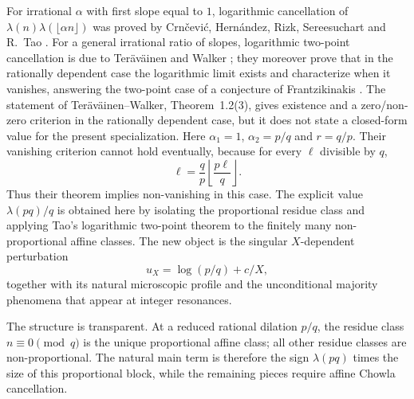 \documentclass[preprint,12pt]{elsarticle}
\numberwithin{equation}{section}
\theoremstyle{plain}
\theoremstyle{definition}
\theoremstyle{definition}
\theoremstyle{remark}
\begin{document}
For irrational $\alpha$ with first slope equal to $1$, logarithmic
cancellation of
$\lambda(n)\lambda(\lfloor\alpha n\rfloor)$ was proved by
Crn\v{c}evi\'c, Hern\'andez, Rizk, Sereesuchart and R.~Tao
\cite{CHRST2024}. For a general irrational ratio of slopes, logarithmic
two-point cancellation is due to Ter\"av\"ainen and Walker
\cite[Theorem~1.2]{TeravainenWalker2025}; they moreover prove that in the
rationally dependent case the logarithmic limit exists and characterize when
it vanishes, answering the two-point case of a conjecture of Frantzikinakis
\cite{Frantzikinakis2020}. The statement of Ter\"av\"ainen--Walker, Theorem~1.2(3), gives existence
and a zero/non-zero criterion in the rationally dependent case, but it does
not state a closed-form value for the present specialization. Here
$\alpha_1=1$, $\alpha_2=p/q$ and $r=q/p$. Their vanishing criterion cannot
hold eventually, because for every $\ell$ divisible by $q$,
\begin{equation}
\ell=\frac qp\left\lfloor\frac{p\ell}{q}\right\rfloor.
\label{eq:o3}
\end{equation}
Thus their theorem implies non-vanishing in this case. The explicit value
$\lambda(pq)/q$ is obtained here by isolating the proportional residue class
and applying Tao's logarithmic two-point theorem to the finitely many
non-proportional affine classes. The new object is the singular
$X$-dependent perturbation
\begin{equation}
u_X=\log(p/q)+c/X,
\label{eq:o4}
\end{equation}
together with its natural microscopic profile and the unconditional majority
phenomena that appear at integer resonances.

The structure is transparent. At a reduced rational dilation $p/q$, the
residue class $n\equiv0\pmod q$ is the unique proportional affine class; all
other residue classes are non-proportional. The natural main term is therefore
the sign $\lambda(pq)$ times the size of this proportional block, while the
remaining pieces require affine Chowla cancellation.
\end{document}
